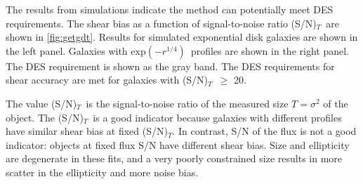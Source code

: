\documentclass[12pt]{article}
\newcommand{\devprof}{exp$(-r^{1/4})$}
\newcommand{\sncut}{20}
\newcommand{\snsize}{(S/N)$_{T}$}
\begin{document}
The results from simulations indicate the method can potentially meet DES
requirements.  The shear bias as a function of signal-to-noise ratio \snsize\
are shown in \ref{fig:getgdt}.  Results for simulated exponential disk galaxies
are shown in the left panel.  Galaxies with \devprof\ profiles are shown in the
right panel.  The DES requirement is shown as the gray band.  The DES
requirements for shear accuracy are met for galaxies with \snsize\ $\geq$
\sncut.  

The value \snsize\ is the signal-to-noise ratio of the measured size
$T=\sigma^2$ of the object.  The \snsize\ is a good indicator because galaxies
with different profiles have similar shear bias at fixed \snsize.  In contrast,
S/N of the flux is not a good indicator: objects at fixed flux S/N have
different shear bias.  Size and ellipticity are degenerate in these fits, and a
very poorly constrained size results in more scatter in the ellipticity and
more noise bias.
\end{document}
